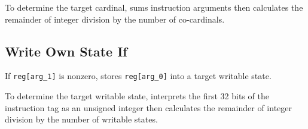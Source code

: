 To determine the target cardinal, sums instruction arguments then calculates the remainder of integer division by the number of co-cardinals.

\subsection{Write Own State If}


If \texttt{reg[arg\_1]} is nonzero, stores \texttt{reg[arg\_0]} into a target writable state.

To determine the target writable state, interprets the first 32 bits of the instruction tag as an unsigned integer then calculates the remainder of integer division by the number of writable states.
